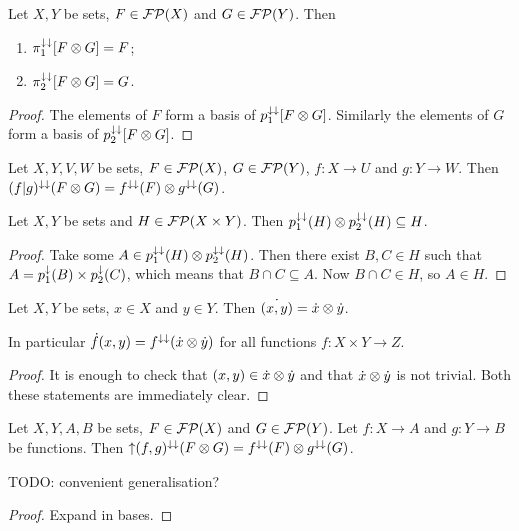 \begin{lemma} \label{projectionsOfProductFilter}
Let $X,Y$ be sets, $F\in \operatorname{\mathcal{FP}}(X)$ and $G\in \operatorname{\mathcal{FP}}(Y)$. Then
\begin{enumerate}
\item $\pi_1^{\downarrow\downarrow}[F\otimes G] = F$;
\item $\pi_2^{\downarrow\downarrow}[F\otimes G] = G$.
\end{enumerate}
\end{lemma}
\begin{proof}
The elements of $F$ form a basis of $p_1^{\downarrow\downarrow}[F\otimes G]$. Similarly the elements of $G$ form a basis of $p_2^{\downarrow\downarrow}[F\otimes G]$.
\end{proof}
\begin{lemma} \label{parallelFunctionProductFilter}
Let $X,Y,V,W$ be sets, $F\in \operatorname{\mathcal{FP}}(X)$, $G\in \operatorname{\mathcal{FP}}(Y)$, $f: X\to U$ and $g: Y\to W$. Then $(f|g)^{\downarrow\downarrow}(F\otimes G) = f^{\downarrow\downarrow}(F)\otimes g^{\downarrow\downarrow}(G)$.
\end{lemma}

\begin{lemma} \label{filterFactorisationInequality}
Let $X,Y$ be sets and $H \in \operatorname{\mathcal{FP}}(X\times Y)$. Then $p_1^{\downarrow\downarrow}(H)\otimes p_2^{\downarrow\downarrow}(H) \subseteq H$.
\end{lemma}
\begin{proof}
Take some $A\in p_1^{\downarrow\downarrow}(H)\otimes p_2^{\downarrow\downarrow}(H)$. Then there exist $B,C\in H$ such that $A = p_1^\downarrow(B)\times p_2^\downarrow(C)$, which means that $B\cap C\subseteq A$. Now $B\cap C \in H$, so $A\in H$.
\end{proof}

\begin{lemma} \label{productPrincipalUltrafilter}
Let $X,Y$ be sets, $x\in X$ and $y\in Y$. Then $\dot{(x,y)} = \dot{x} \otimes \dot{y}$.
\end{lemma}
In particular $\dot{f}(x,y) = f^{\downarrow\downarrow}(\dot{x}\otimes\dot{y})$ for all functions $f: X\times Y \to Z$.
\begin{proof}
It is enough to check that $(x,y)\in\dot{x}\otimes\dot{y}$ and that $\dot{x}\otimes\dot{y}$ is not trivial. Both these statements are immediately clear.
\end{proof}

\begin{lemma} \label{functionsOfProductFilters}
Let $X,Y, A,B$ be sets, $F\in \operatorname{\mathcal{FP}}(X)$ and $G\in \operatorname{\mathcal{FP}}(Y)$. Let $f: X\to A$ and $g: Y\to B$ be functions. Then $\operatorname{\uparrow} (f,g)^{\downarrow\downarrow}(F\otimes G) = f^{\downarrow\downarrow}(F)\otimes g^{\downarrow\downarrow}(G)$.
\end{lemma}
TODO: convenient generalisation?
\begin{proof}
Expand in bases.
\end{proof}

